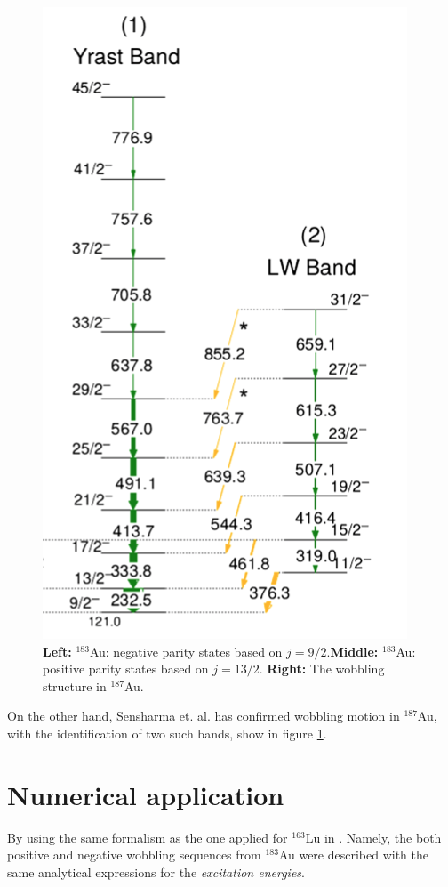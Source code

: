 \documentclass[12pt, a4paper]{article}
\begin{document}
\begin{figure}[ht]
    \includegraphics[scale=0.3]{figs/spectrum_Au187.png}
    \caption{\textbf{Left:} $^{183}$Au: negative parity states based on $j=9/2$.\textbf{Middle:} $^{183}$Au: positive parity states based on $j=13/2$. \textbf{Right:} The wobbling structure in $^{187}$Au.}
    \label{au_wobbling_bands}
\end{figure}

On the other hand, Sensharma et. al. \cite{sensharma2020} has confirmed wobbling motion in $^{187}$Au, with the identification of two such bands, show in figure \ref{au_wobbling_bands}.

\section{Numerical application}

By using the same formalism as the one applied for $^{163}$Lu in \cite{poenaru2021parity}. Namely, the both positive and negative wobbling sequences from $^{183}$Au were described with the same analytical expressions for the \textit{excitation energies}.

\newpage


\end{document}
